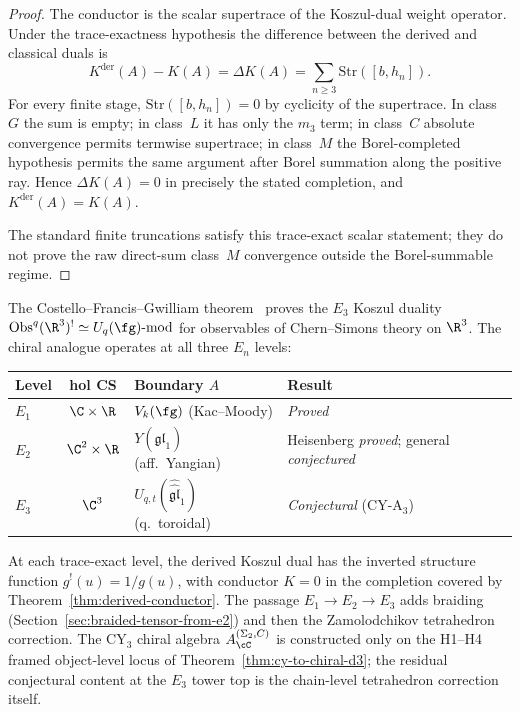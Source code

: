 \begin{proof}
The conductor is the scalar supertrace of the Koszul-dual weight
operator. Under the trace-exactness hypothesis the difference between
the derived and classical duals is
\[
 K^{\mathrm{der}}(A)-K(A)
 =
 \Delta K(A)
 =
 \sum_{n\geq 3}\mathrm{Str}([b,h_n]).
\]
For every finite stage,
$\mathrm{Str}([b,h_n])=0$ by cyclicity of the supertrace. In class~$G$
the sum is empty; in class~$L$ it has only the $m_3$ term; in
class~$C$ absolute convergence permits termwise supertrace; in
class~$M$ the Borel-completed hypothesis permits the same argument
after Borel summation along the positive ray. Hence
$\Delta K(A)=0$ in precisely the stated completion, and
$K^{\mathrm{der}}(A)=K(A)$.

The standard finite truncations satisfy this trace-exact scalar
statement; they do not prove the raw direct-sum class~$M$ convergence
outside the Borel-summable regime.
\end{proof}

\begin{remark}
\label{rem:cfg25-hierarchy}
The Costello--Francis--Gwilliam theorem~\cite{CostelloFrancisGwilliam}
proves the $E_3$ Koszul duality
$\mathrm{Obs}^q(\R^3)^! \simeq U_q(\fg)\text{-mod}$
for observables of Chern--Simons theory on $\R^3$. The chiral analogue
operates at all three $E_n$ levels:

\medskip
\begin{center}
\begin{tabular}{lcll}
\textbf{Level} & \textbf{hol CS} & \textbf{Boundary $A$} &
\textbf{Result} \\
\hline
$E_1$ & $\C \times \R$ & $V_k(\fg)$ (Kac--Moody) &
 \emph{Proved} \\
$E_2$ & $\C^2 \times \R$ & $Y(\widehat{\mathfrak{gl}}_1)$
 (aff.\ Yangian) & Heisenberg \emph{proved};
 general \emph{conjectured} \\
$E_3$ & $\C^3$ & $U_{q,t}(\widehat{\widehat{\mathfrak{gl}}}_1)$
 (q.\ toroidal) & \emph{Conjectural} (CY-A$_3$) \\
\end{tabular}
\end{center}

\medskip
\noindent At each trace-exact level, the derived Koszul dual has the inverted
structure function $g^!(u) = 1/g(u)$, with conductor $K = 0$ in the
completion covered by Theorem~\ref{thm:derived-conductor}. The passage
$E_1 \to E_2 \to E_3$ adds braiding
(Section~\ref{sec:braided-tensor-from-e2}) and then the Zamolodchikov
tetrahedron correction. The CY$_3$ chiral algebra $A_\cC^{(\Sigma_2,C)}$
is constructed only on the H1--H4 framed object-level locus of
Theorem~\textup{\ref{thm:cy-to-chiral-d3}};
the residual conjectural content at the $E_3$ tower top is the
chain-level tetrahedron correction itself.
\end{remark}

